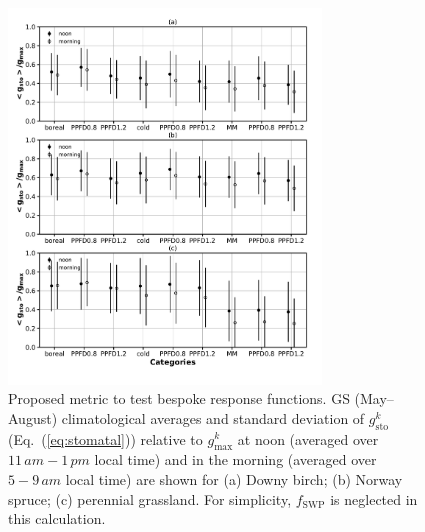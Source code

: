 \documentclass[bg, manuscript]{copernicus}
\begin{document}
\begin{figure}[t]
  \includegraphics[width=8.3cm]{fig10}
  \caption{Proposed metric to test bespoke response functions. GS (May--August) climatological averages and standard deviation of $g_\mathrm{sto}^k$ (Eq.~(\ref{eq:stomatal})) relative to $g_\mathrm{max}^k$ at noon (averaged over $11\,\unit{am}-1\,\unit{pm}$ local time) and in the morning (averaged over $5-9\,\unit{am}$ local time) are shown for (a) Downy birch; (b) Norway spruce; (c) perennial grassland. For simplicity, $f_\mathrm{SWP}$ is neglected in this calculation. }
  \label{fig:javis_func_opt_mean}
\end{figure}
\end{document}
